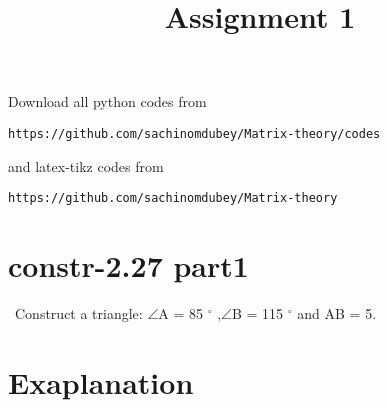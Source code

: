 \documentclass[journal,12pt,twocolumn]{IEEEtran}
\begin{document}
     \def\rightbox#1{\makebox[0in][r]{#1}}
     \def\centbox#1{\makebox[0in]{#1}}
     \def\topbox#1{\raisebox{-\baselineskip}[0in][0in]{#1}}
     \def\midbox#1{\raisebox{-0.5\baselineskip}[0in][0in]{#1}}
\vspace{3cm}
\title{Assignment 1}
\maketitle
\newpage
\bigskip
\renewcommand{\thefigure}{\theenumi}
\renewcommand{\thetable}{\theenumi}
Download all python codes from 
\begin{lstlisting}
https://github.com/sachinomdubey/Matrix-theory/codes
\end{lstlisting}
%
and latex-tikz codes from 
%
\begin{lstlisting}
https://github.com/sachinomdubey/Matrix-theory
\end{lstlisting}
%
\section{constr-2.27 part1}
\ Construct a triangle: $\angle$A = 85 $^{\circ}$ ,$\angle$B = 115 $^{\circ}$ and AB = 5.

\section{Exaplanation}
%
\end{document}
